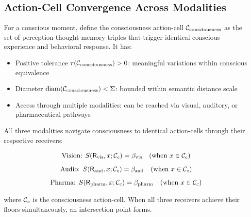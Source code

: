 \subsection{Action-Cell Convergence Across Modalities}

\begin{definition}
For a conscious moment, define the consciousness action-cell $\mathcal{C}_{\text{consciousness}}$ as the set of perception-thought-memory triples that trigger identical conscious experience and behavioral response. It has:
\begin{itemize}
\item Positive tolerance $\tau(\mathcal{C}_{\text{consciousness}}) > 0$: meaningful variations within conscious equivalence
\item Diameter $\mathrm{diam}(\mathcal{C}_{\text{consciousness}}) < \Sigma$: bounded within semantic distance scale
\item Access through multiple modalities: can be reached via visual, auditory, or pharmaceutical pathways
\end{itemize}
\end{definition}

\begin{theorem}
\label{thm:convergence}
All three modalities navigate consciousness to identical action-cells through their respective receivers:

$$\text{Vision: } S(\mathsf{R}_{\text{vis}}, x; \mathcal{C}_c) = \beta_{\text{vis}} \quad \text{(when } x \in \mathcal{C}_c)$$
$$\text{Audio: } S(\mathsf{R}_{\text{aud}}, x; \mathcal{C}_c) = \beta_{\text{aud}} \quad \text{(when } x \in \mathcal{C}_c)$$
$$\text{Pharma: } S(\mathsf{R}_{\text{pharm}}, x; \mathcal{C}_c) = \beta_{\text{pharm}} \quad \text{(when } x \in \mathcal{C}_c)$$

where $\mathcal{C}_c$ is the consciousness action-cell. When all three receivers achieve their floors simultaneously, an intersection point forms.
\end{theorem}

